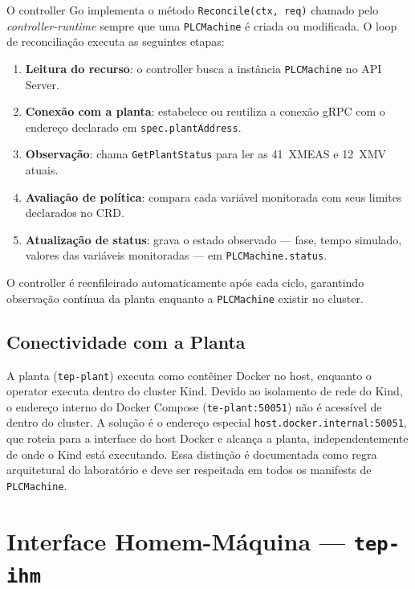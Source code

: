 O controller Go implementa o método \texttt{Reconcile(ctx, req)} chamado pelo \textit{controller-runtime} sempre que uma \texttt{PLCMachine} é criada ou modificada. O loop de reconciliação executa as seguintes etapas:

\begin{enumerate}
  \item \textbf{Leitura do recurso}: o controller busca a instância \texttt{PLCMachine} no API Server.
  \item \textbf{Conexão com a planta}: estabelece ou reutiliza a conexão gRPC com o endereço declarado em \texttt{spec.plantAddress}.
  \item \textbf{Observação}: chama \texttt{GetPlantStatus} para ler as 41~XMEAS e 12~XMV atuais.
  \item \textbf{Avaliação de política}: compara cada variável monitorada com seus limites declarados no CRD.
  \item \textbf{Atualização de status}: grava o estado observado — fase, tempo simulado, valores das variáveis monitoradas — em \texttt{PLCMachine.status}.
\end{enumerate}

O controller é reenfileirado automaticamente após cada ciclo, garantindo observação contínua da planta enquanto a \texttt{PLCMachine} existir no cluster.

\subsection{Conectividade com a Planta}

A planta (\texttt{tep-plant}) executa como contêiner Docker no host, enquanto o operator executa dentro do cluster Kind. Devido ao isolamento de rede do Kind, o endereço interno do Docker Compose (\texttt{te-plant:50051}) não é acessível de dentro do cluster. A solução é o endereço especial \texttt{host.docker.internal:50051}, que roteia para a interface do host Docker e alcança a planta, independentemente de onde o Kind está executando. Essa distinção é documentada como regra arquitetural do laboratório e deve ser respeitada em todos os manifests de \texttt{PLCMachine}.

\section{Interface Homem-Máquina — \texttt{tep-ihm}}
\label{sec:ihm}

